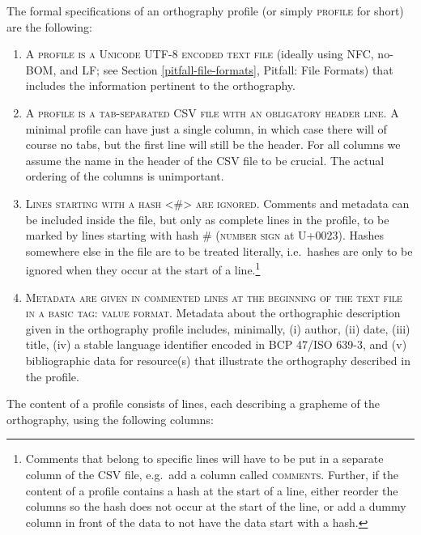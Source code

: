 The formal specifications of an orthography profile (or simply \textsc{profile} for short) are the following:

\begin{enumerate}
	\def\labelenumi{\arabic{enumi}.} 
	\item \textsc{A profile is a} \textsc{Unicode UTF-8 encoded text file} (ideally using NFC, no-BOM, and LF; see Section \ref{pitfall-file-formats}, Pitfall: File Formats) that includes the information pertinent to the orthography. 
	\item \textsc{A profile is a} \textsc{tab-separated CSV file with an obligatory header line}. A minimal profile can have just a single column, in which case there will of course no tabs, but the first line will still be the header. For all columns we assume the name in the header of the CSV file to be crucial. The actual ordering of the columns is unimportant. 
	\item \textsc{Lines starting with a hash \textless{}\#\textgreater{} are ignored.} Comments and metadata can be included inside the file, but only as complete lines in the profile, to be marked by lines starting with hash \textsc{\#} (\textsc{number sign} at U+0023). Hashes somewhere else in the file are to be treated literally, i.e.~hashes are only to be ignored when they occur at the start of a line.\footnote{Comments that belong to specific lines will have to be put in a separate column of the CSV file, e.g.~add a column called \textsc{comments}. Further, if the content of a profile contains a hash at the start of a line, either reorder the columns so the hash does not occur at the start of the line, or add a dummy column in front of the data to not have the data start with a hash.} 
	\item \textsc{Metadata are given in commented lines at the beginning of the text file in a basic \textsc{tag: value} format. }Metadata about the orthographic description given in the orthography profile includes, minimally, (i) author, (ii) date, (iii) title, (iv) a stable language identifier encoded in BCP 47/ISO 639-3, and (v) bibliographic data for resource(s) that illustrate the orthography described in the profile. 
\end{enumerate}

The content of a profile consists of lines, each describing a grapheme of the orthography, using the following columns:

